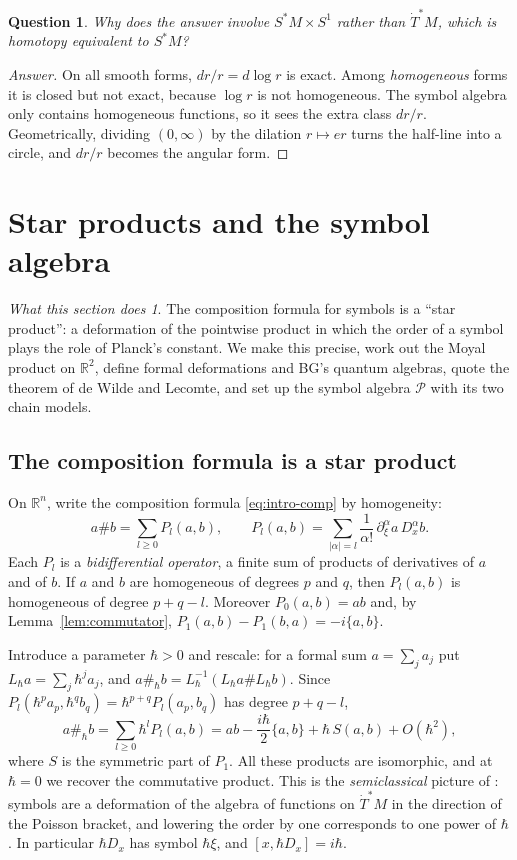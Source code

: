 \documentclass[11pt,oneside,reqno]{article}
\newcommand{\R}{\mathbb R}
\newcommand{\cP}{\mathcal P}
\newcommand{\Tdot}{\dot T^*}
\newcommand{\hb}{\hbar}
\newcommand{\pa}{\partial}
\theoremstyle{plain}
\newtheorem{question}[theorem]{Question}
\theoremstyle{definition}
\theoremstyle{remark}
\newtheorem*{whatdoes}{What this section does}
\newenvironment{answer}{\begin{proof}[Answer]}{\end{proof}}
\begin{document}
\begin{question}
Why does the answer involve \(S^*M\times S^1\) rather than \(\Tdot M\), which is
homotopy equivalent to \(S^*M\)?
\end{question}
\begin{answer}
On all smooth forms, \(dr/r=d\log r\) is exact. Among \emph{homogeneous} forms
it is closed but not exact, because \(\log r\) is not homogeneous. The
symbol algebra only contains homogeneous functions, so it sees the extra
class \(dr/r\). Geometrically, dividing \((0,\infty)\) by the dilation
\(r\mapsto er\) turns the half-line into a circle, and \(dr/r\) becomes the
angular form.
\end{answer}

\section{Star products and the symbol algebra}\label{sec:star}

\begin{whatdoes}
The composition formula for symbols is a ``star product'': a deformation of
the pointwise product in which the order of a symbol plays the role of
Planck's constant. We make this precise, work out the Moyal product on
\(\R^2\), define formal deformations and BG's quantum algebras, quote the
theorem of de Wilde and Lecomte, and set up the symbol algebra \(\cP\) with its
two chain models.
\end{whatdoes}

\subsection{The composition formula is a star product}\label{subsec:compstar}
On \(\R^n\), write the composition formula \eqref{eq:intro-comp} by
homogeneity:
\[
 a\#b=\sum_{l\ge0}P_l(a,b),\qquad
 P_l(a,b)=\sum_{|\alpha|=l}\frac1{\alpha!}\,\pa_\xi^\alpha a\,D_x^\alpha b .
\]
Each \(P_l\) is a \emph{bidifferential operator}, a finite sum of products of
derivatives of \(a\) and of \(b\). If \(a\) and \(b\) are homogeneous of degrees \(p\)
and \(q\), then \(P_l(a,b)\) is homogeneous of degree \(p+q-l\). Moreover
\(P_0(a,b)=ab\) and, by Lemma~\ref{lem:commutator},
\(P_1(a,b)-P_1(b,a)=-i\{a,b\}\).

Introduce a parameter \(\hb>0\) and rescale: for a formal sum \(a=\sum_ja_j\) put
\(L_\hb a=\sum_j\hb^ja_j\), and \(a\#_\hb b=L_\hb^{-1}(L_\hb a\#L_\hb b)\). Since
\(P_l(\hb^pa_p,\hb^qb_q)=\hb^{p+q}P_l(a_p,b_q)\) has degree \(p+q-l\),
\[
 a\#_\hb b=\sum_{l\ge0}\hb^lP_l(a,b)=ab-\frac{i\hb}{2}\{a,b\}+\hb\,S(a,b)+O(\hb^2),
\]
where \(S\) is the symmetric part of \(P_1\). All these products are isomorphic, and
at \(\hb=0\) we recover the commutative product. This is the
\emph{semiclassical} picture of \cite{BG}: symbols are a deformation of the
algebra of functions on \(\Tdot M\) in the direction of the Poisson bracket, and
lowering the order by one corresponds to one power of \(\hb\). In particular
\(\hb D_x\) has symbol \(\hb\xi\), and \([x,\hb D_x]=i\hb\).
\end{document}
